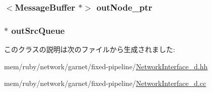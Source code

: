 \label{classNetworkInterface__d_ac6b53ee37454b0be010596ffff96d307}
\hypertarget{classNetworkInterface__d_aff22e632df88a83fbcbac281efec0dcc}{
\subsubsection[{outNode\_\-ptr}]{$<${\bf MessageBuffer} $\ast$$>$ {\bf outNode\_\-ptr}}}
\label{classNetworkInterface__d_aff22e632df88a83fbcbac281efec0dcc}
\hypertarget{classNetworkInterface__d_aaf13976ec6e83029468aab14cef7c812}{
\subsubsection[{outSrcQueue}]{$\ast$ {\bf outSrcQueue}}}
\label{classNetworkInterface__d_aaf13976ec6e83029468aab14cef7c812}


このクラスの説明は次のファイルから生成されました:\begin{DoxyCompactItemize}
\item 
mem/ruby/network/garnet/fixed-\/pipeline/\hyperlink{NetworkInterface__d_8hh}{NetworkInterface\_\-d.hh}\item 
mem/ruby/network/garnet/fixed-\/pipeline/\hyperlink{NetworkInterface__d_8cc}{NetworkInterface\_\-d.cc}\end{DoxyCompactItemize}
